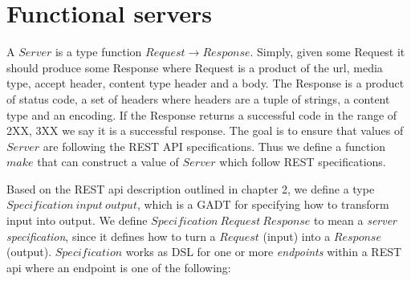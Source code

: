 
\section{Functional servers}

A $Server$ is a type function $Request \rightarrow Response$. Simply, given some
Request it should produce some Response where Request is a product of the url,
media type, accept header, content type header and a body.  The Response is a
product of status code, a set of headers where headers are a tuple of strings, a
content type and an encoding. If the Response returns a successful code in the
range of 2XX, 3XX we say it is a successful response. The goal is to ensure that
values of $Server$ are following the REST API specifications.  Thus we define a
function $make$ that can construct a value of $Server$ which follow REST
specifications.

Based on the REST api description outlined in chapter 2, we define a type
$Specification\ input\ output$, which is a GADT for specifying how to transform
input into output. We define $Specification\ Request\ Response$ to mean a
\textit{server specification}, since it defines how to turn a $Request$ (input)
into a $Response$ (output). $Specification$ works as DSL for one or more
\textit{endpoints} within a REST api where an endpoint is one of the following:

